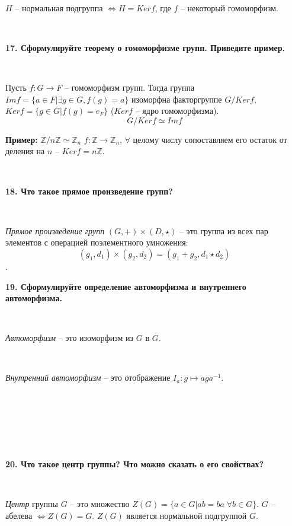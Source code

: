 \documentclass{article}
\begin{document}
	{
		$\;$
		\setlength{\parindent}{0.4cm}
		\hangindent=0.4cm
		
		$H$ -- нормальная подгруппа $\Leftrightarrow H=Ker f$, где $f$ -- некоторый гомоморфизм.
		
		$\;$
		\setlength{\parindent}{0cm}
		\hangindent=0cm
	}
	
	\textbf{17. Сформулируйте теорему о гомоморфизме групп. Приведите пример.}
	
	{
		$\;$
		\setlength{\parindent}{0.4cm}
		\hangindent=0.4cm
		
		Пусть $f:G\rightarrow F$ -- гомоморфизм групп. Тогда группа $Im f =\{a\in F|\exists g\in G, f(g)=a \}$ изоморфна факторгруппе $G/Ker f$, $Ker f=\{g\in G|f(g)=e_F \}$ ($Ker f$ -- ядро гомоморфизма).
	$$G/Ker f\simeq Im f$$
		
		\textbf{Пример:} $\mathbb{Z}/n\mathbb{Z}\simeq\mathbb{Z}_n$ $f:\mathbb{Z}\rightarrow\mathbb{Z}_n$, $\forall$ целому числу сопоставляем его остаток от деления на $n$ -- $Ker f=n\mathbb{Z}$.
		
		$\;$
		\setlength{\parindent}{0cm}
		\hangindent=0cm
	}
	
	\textbf{18. Что такое прямое произведение групп?}
	
	{
		$\;$
		\setlength{\parindent}{0.4cm}
		\hangindent=0.4cm
		
		\textit{Прямое произведение групп} $(G, +)\times(D, \star)$ -- это группа из всех пар элементов с операцией поэлементного умножения: $$(g_1, d_1)\times(g_2, d_2)=(g_1+g_2, d_1\star d_2)$$.
		$\;$
		\setlength{\parindent}{0cm}
		\hangindent=0cm
	}
	
	\textbf{19. Сформулируйте определение автоморфизма и внутреннего автоморфизма.}
	
	{
		$\;$
		\setlength{\parindent}{0.4cm}
		\hangindent=0.4cm
		
		\textit{Автоморфизм} -- это изоморфизм из $G$ в $G$.
		
		$\;$
		
		\textit{Внутренний автоморфизм} -- это отображение $I_a:g\mapsto aga^{-1}$.
		
		$\;$
		\setlength{\parindent}{0cm}
		\hangindent=0cm
	}
	\textbf{}\\
	\textbf{}\\
	\textbf{}\\
	\textbf{}\\
	\textbf{20. Что такое центр группы? Что можно сказать о его свойствах?}
	
	{
		$\;$
		\setlength{\parindent}{0.4cm}
		\hangindent=0.4cm
		
		\textit{Центр} группы $G$ -- это множество $Z(G)=\{a\in G|ab=ba\;\forall b\in G \}$. $G$ -- абелева $\Leftrightarrow Z(G)=G$. $Z(G)$ является нормальной подгруппой $G$.
		
		$\;$
		\setlength{\parindent}{0cm}
		\hangindent=0cm
	}
	
\end{document}
